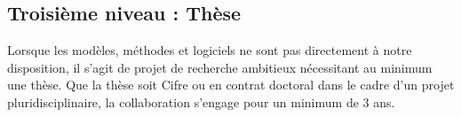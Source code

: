 \subsection*{Troisième niveau : Thèse}
Lorsque les modèles, méthodes et logiciels ne sont pas directement à notre disposition, il s'agit de projet de recherche ambitieux nécessitant au minimum une thèse. Que la thèse soit Cifre ou en contrat doctoral dans le cadre d'un projet pluridisciplinaire, la collaboration s'engage pour un minimum de 3 ans.
